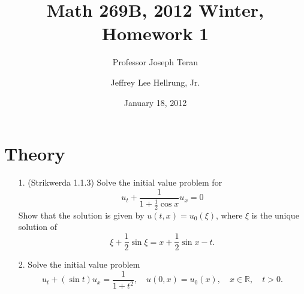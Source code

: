 \documentclass{article}
\begin{document}
\title{Math 269B, 2012 Winter, Homework 1}
\date{January 18, 2012}
\author{Professor Joseph Teran \and Jeffrey Lee Hellrung, Jr.}
\maketitle

\section{Theory}

\begin{itemize}

\item[1.] (Strikwerda 1.1.3) Solve the initial value problem for
\begin{equation*}
u_t + \frac{1}{1 + \frac{1}{2} \cos x} u_x = 0
\end{equation*}
Show that the solution is given by $u(t,x) = u_0(\xi)$, where $\xi$ is the unique solution of
\begin{equation*}
\xi + \frac{1}{2} \sin \xi = x + \frac{1}{2} \sin x - t.
\end{equation*}

\item[2.] Solve the initial value problem
\begin{equation*}
u_t + \left( \sin t \right) u_x = \frac{1}{1 + t^2}, \quad u(0,x) = u_0(x), \quad x \in \mathbb{R}, \quad t > 0.
\end{equation*}


\end{itemize}
\end{document}
